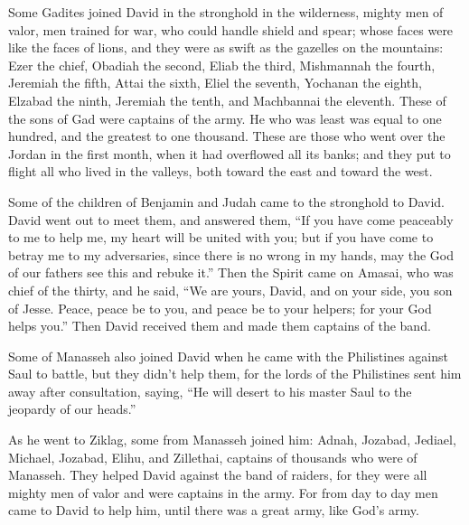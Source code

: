 \myverse{}Some Gadites joined David in the stronghold in the wilderness,
mighty men of valor, men trained for war, who could handle shield and spear; whose faces were like the
faces of lions, and they were as swift as the gazelles on the mountains:
\myverse{}Ezer the chief, Obadiah the second, Eliab the third,
\myverse{}Mishmannah the fourth, Jeremiah the fifth,
\myverse{}Attai the sixth, Eliel the seventh,
\myverse{}Yochanan the eighth, Elzabad the ninth,
\myverse{}Jeremiah the tenth, and Machbannai the eleventh.
\myverse{}These of the sons of Gad were captains of the army. He who was least was
equal to one hundred, and the greatest to one thousand.
\myverse{}These are those who went over the Jordan in the first month, when it had
overflowed all its banks; and they put to flight all who lived in the valleys, both toward the east and
toward the west.

\myverse{}Some of the children of Benjamin and Judah came to the stronghold
to David.
\myverse{}David went out to meet them, and answered them, “If you have come peaceably
to me to help me, my heart will be united with you; but if you have come to betray me to my adversaries,
since there is no wrong in my hands, may the God of our fathers see this and rebuke it.”
\myverse{}Then the Spirit came on Amasai, who was chief of the thirty, and he said,
“We are yours, David, and on your side, you son of Jesse. Peace, peace be to you, and peace be to your
helpers; for your God helps you.” Then David received them and made them captains of the band.

\myverse{}Some of Manasseh also joined David when he came with the Philistines
against Saul to battle, but they didn’t help them, for the lords of the Philistines sent him away after
consultation, saying, “He will desert to his master Saul to the jeopardy of our heads.”

\myverse{}As he went to Ziklag, some from Manasseh joined him: Adnah,
Jozabad, Jediael, Michael, Jozabad, Elihu, and Zillethai, captains of thousands who were of Manasseh.
\myverse{}They helped David against the band of raiders, for they were all mighty men
of valor and were captains in the army.
\myverse{}For from day to day men came to David to help him, until there was a great
army, like God’s army.

